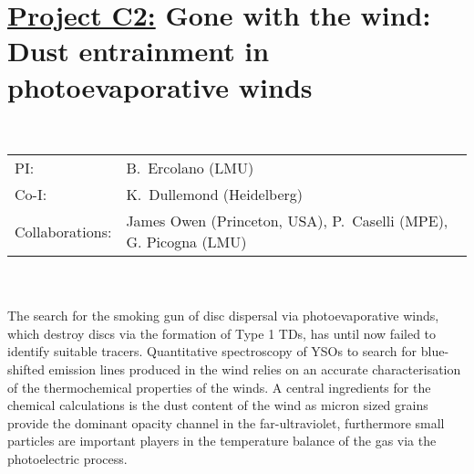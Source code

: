 

\pagebreak[4]

\section*{\underline{Project C2:} 
Gone with the wind: Dust entrainment in photoevaporative winds}

\\
\begin{tabular}{ll}
{\textsf{PI:}}                  & B.~Ercolano (LMU)\\
{\textsf{Co-I:}}                & K.~Dullemond (Heidelberg)\\
{\textsf{Collaborations:}}      & James Owen (Princeton, USA), P.~Caselli (MPE), G. Picogna (LMU) \\
\end{tabular}

\vspace{0.5em}
 \\

\vspace{0.5em}
\\
The search for the smoking gun of disc dispersal via photoevaporative
winds, which destroy discs via the formation of Type 1 TDs,  has until
now failed to identify suitable tracers. Quantitative spectroscopy of
YSOs to search for blue-shifted emission lines produced in the wind
relies on an accurate characterisation of the thermochemical
properties of the winds. A central ingredients for the chemical
calculations is the dust content of the wind as micron sized grains
provide the dominant opacity channel in the far-ultraviolet,
furthermore small particles are important players in the temperature
balance of the gas via the photoelectric process.  

